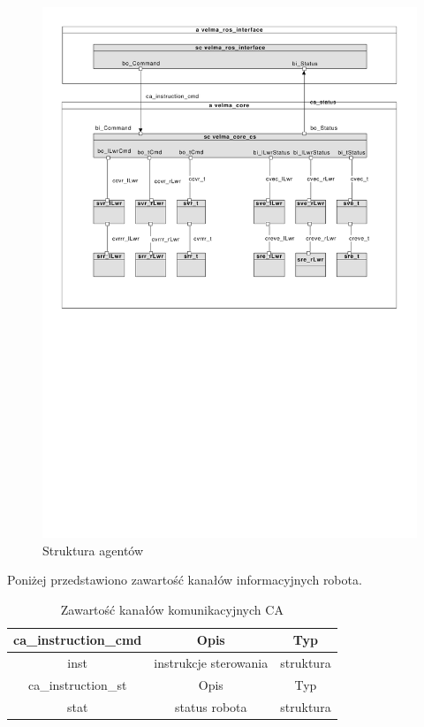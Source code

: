 \documentclass[]{article}
\begin{document}
\begin{figure}[H]
	\centering
	\includegraphics[width=0.8\linewidth]{main}
	\caption{Struktura agentów}
	\label{fig:agents}
\end{figure}

Poniżej przedstawiono zawartość kanałów informacyjnych robota.
\begin{table}[H]
	\begin{tabular}{||c|cc||}
		\hline\hline
		ca\_instruction\_cmd & Opis & Typ \\
		\hline\hline
		inst & instrukcje sterowania & struktura \\
		\hline\hline
		ca\_instruction\_st & Opis & Typ \\
		\hline\hline
		stat & status robota & struktura \\
		\hline
	\end{tabular}
	\label{tab:ca}
	\caption{Zawartość kanałów komunikacyjnych CA}
\end{table}
\end{document}
